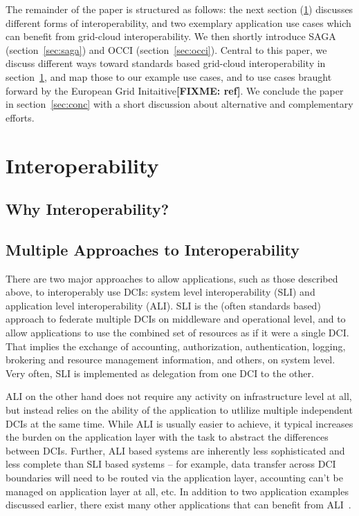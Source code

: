 \documentclass[10pt,conference,final,letterpaper,twoside,twocolumn,]{IEEEtran}
\newcommand{\B}[1]{\textbf{#1}}
\newcommand{\F}[1]{\B{[FIXME: #1]}}
\begin{document}
 The remainder of the paper is structured as follows: the next section
 (\ref{sec:interop}) discusses different forms of interoperability,
 and two exemplary application use cases which can benefit from
 grid-cloud interoperability.  We then shortly introduce SAGA
 (section~\ref{sec:saga}) and OCCI (section~\ref{sec:occi}).  Central
 to this paper, we discuss different ways toward standards based
 grid-cloud interoperability in section~\ref{sec:interop}, and map
 those to our example use cases, and to use cases braught forward by
 the European Grid Initaitive\F{ref}.  We conclude the paper in
 section~\ref{sec:conc} with a short discussion about alternative and
 complementary efforts.

\section{Interoperability}
\label{sec:interop}

\subsection*{Why Interoperability?}

 \subsection*{Multiple Approaches to Interoperability}
 
 There are two major approaches to allow applications, such as those
 described above, to interoperably use DCIs: system level
 interoperability (SLI) and application level interoperability (ALI).
 SLI is the (often standards based) approach to federate multiple DCIs
 on middleware and operational level, and to allow applications to use
 the combined set of resources as if it were a single DCI.  That
 implies the exchange of accounting, authorization, authentication,
 logging, brokering and resource management information, and others,
 on system level.  Very often, SLI is implemented as delegation from
 one DCI to the other.

 ALI on the other hand does not require any activity on infrastructure
 level at all, but instead relies on the ability of the application to
 utlilize multiple independent DCIs at the same time.  While ALI is
 usually easier to achieve, it typical increases the burden on the
 application layer with the task to abstract the differences between
 DCIs.  Further, ALI based systems are inherently less sophisticated
 and less complete than SLI based systems -- for example, data
 transfer across DCI boundaries will need to be routed via the
 application layer, accounting can't be managed on application layer
 at all, etc. In addition to two application examples discussed
 earlier, there exist many other applications that can benefit from
 ALI~\cite{fgcs-interop}.
 
\end{document}
